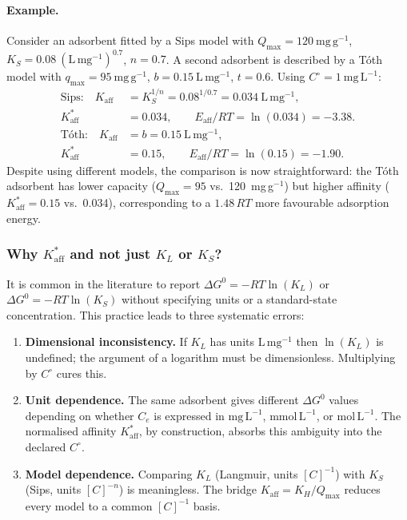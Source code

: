 \documentclass[12pt]{article}
\begin{document}
	\paragraph{Example.}
	Consider an adsorbent fitted by a Sips model with
	$Q_{\max} = 120~\mathrm{mg\,g^{-1}}$,
	$K_S = 0.08~\mathrm{(L\,mg^{-1})^{0.7}}$, $n = 0.7$.
	A second adsorbent is described by a T\'oth model with
	$q_{\max} = 95~\mathrm{mg\,g^{-1}}$,
	$b = 0.15~\mathrm{L\,mg^{-1}}$, $t = 0.6$.
	Using $C^\circ = 1~\mathrm{mg\,L^{-1}}$:
	\begin{align}
		\text{Sips:}\quad
		K_{\mathrm{aff}}
		&= K_S^{1/n} = 0.08^{1/0.7}
		= 0.034~\mathrm{L\,mg^{-1}},
		\nonumber\\
		K_{\mathrm{aff}}^{\ast} &= 0.034,
		\qquad
		E_{\mathrm{aff}} / RT = \ln(0.034) = -3.38.
		\nonumber\\[4pt]
		\text{T\'oth:}\quad
		K_{\mathrm{aff}}
		&= b = 0.15~\mathrm{L\,mg^{-1}},
		\nonumber\\
		K_{\mathrm{aff}}^{\ast} &= 0.15,
		\qquad
		E_{\mathrm{aff}} / RT = \ln(0.15) = -1.90.
	\end{align}
	Despite using different models, the comparison is now
	straightforward: the T\'oth adsorbent has lower capacity
	($Q_{\max} = 95$ vs.\ 120~mg\,g$^{-1}$) but higher affinity
	($K_{\mathrm{aff}}^{\ast} = 0.15$ vs.\ 0.034), corresponding to
	a $1.48\,RT$ more favourable adsorption energy.

	\subsubsection{Why $K_{\mathrm{aff}}^{\ast}$ and not just
		$K_L$ or $K_S$?}

	It is common in the literature to report $\Delta G^0 = -RT\ln(K_L)$
	or $\Delta G^0 = -RT\ln(K_S)$ without specifying units or a
	standard-state concentration.  This practice leads to three
	systematic errors:

	\begin{enumerate}
		\item \textbf{Dimensional inconsistency.}
		If $K_L$ has units $\mathrm{L\,mg^{-1}}$ then
		$\ln(K_L)$ is undefined; the argument of a logarithm must be
		dimensionless.  Multiplying by $C^\circ$ cures this.

		\item \textbf{Unit dependence.}
		The same adsorbent gives different $\Delta G^0$ values
		depending on whether $C_e$ is expressed in
		$\mathrm{mg\,L^{-1}}$, $\mathrm{mmol\,L^{-1}}$, or
		$\mathrm{mol\,L^{-1}}$.
		The normalised affinity $K_{\mathrm{aff}}^{\ast}$, by
		construction, absorbs this ambiguity into the declared
		$C^\circ$.

		\item \textbf{Model dependence.}
		Comparing $K_L$ (Langmuir, units $[C]^{-1}$) with
		$K_S$ (Sips, units $[C]^{-n}$) is meaningless.
		The bridge $K_{\mathrm{aff}} = K_H / Q_{\max}$ reduces
		every model to a common $[C]^{-1}$ basis.
	\end{enumerate}
\end{document}
